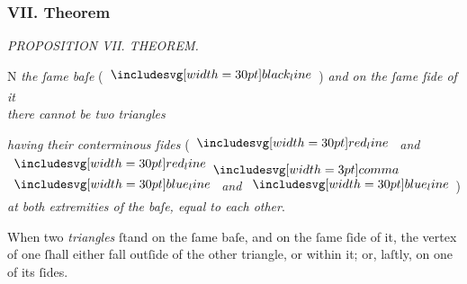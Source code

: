 \documentclass[11pt,preview]{standalone}
\begin{document}
\subsubsection{VII. Theorem}

\begin{minipage}[t]{0.54\textwidth}
    \begin{center}
        \textit{PROPOSITION VII. THEOREM.}\label{book1pr7} \\
    \end{center}

    \hfill

    \begin{center}
        \raggedright \lettrine[lines=3, loversize=1, nindent=0pt]{}{}N \textit{the ſame baſe} (\hspace{-1ex}$\blackline$\hspace{-1ex}) \textit{and on the ſame ſide of it\\ there cannot be two triangles}
    \end{center}
    \textit{having their conterminous ſides} (\hspace{-1ex}$\redline$ \textit{and} $\redline \bcomma$ $\blueline$ \textit{and} $\blueline$\hspace{-1ex}) \textit{at both extremities of} \textit{the baſe, equal to each other}.
\end{minipage}%
\hfill
\begin{minipage}[t]{0.43\textwidth}
    \vspace{20pt}
    
\end{minipage}

\hfill

\raggedright When two \textit{triangles} ſtand on the ſame baſe, and on the ſame ſide of it, the vertex of one ſhall either fall outſide of the other triangle, or within it; or, laſtly, on one of its ſides.

\hfill
\end{document}

